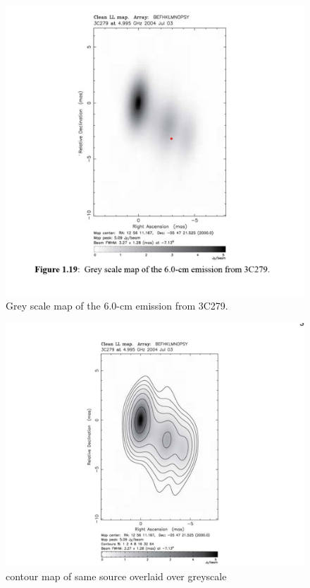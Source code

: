 \documentclass[10pt]{report}
\begin{document}
\begin{itemize}
\begin{figure}\label{figgrey}
\includegraphics[scale=1]{figrey.png}
\caption{Grey scale map of the 6.0-cm emission from 3C279.}
\end{figure}
\begin{figure}\label{figcorey}
\includegraphics[scale=1]{figcorey.png}
\caption{contour map of same source overlaid over greyscale}
\end{figure}

\end{itemize}
\end{document}
